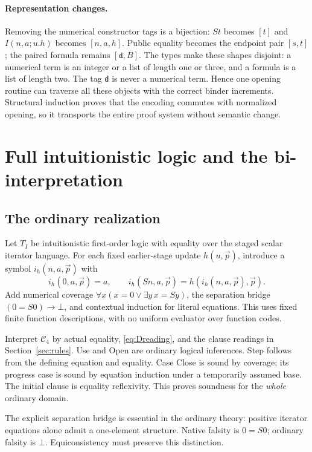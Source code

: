 \documentclass[11pt]{article}
\theoremstyle{definition}
\newcommand{\RC}{\mathcal C_4}
\begin{document}
\paragraph{Representation changes.}
Removing the numerical constructor tags is a bijection: $St$ becomes
$[t]$ and $I(n,a;u.h)$ becomes $[n,a,h]$. Public equality becomes the
endpoint pair $[s,t]$; the paired formula remains $[\texttt{d},B]$.
The types make these shapes disjoint: a numerical term is an integer or
a list of length one or three, and a formula is a list of length two.
The tag \texttt{d} is never a numerical term. Hence one opening routine
can traverse all these objects with the correct binder increments.
Structural induction proves that the encoding commutes with normalized
opening, so it transports the entire proof system without semantic change.

\section{Full intuitionistic logic and the bi-interpretation}
\label{sec:bridge}

\subsection{The ordinary realization}

Let $T_I$ be intuitionistic first-order logic with equality over the staged
scalar iterator language. For each fixed earlier-stage update $h(u,\vec p)$,
introduce a symbol $i_h(n,a,\vec p)$ with
\[
 i_h(0,a,\vec p)=a,\qquad
 i_h(Sn,a,\vec p)=h(i_h(n,a,\vec p),\vec p).
\]
Add numerical coverage $\forall x(x=0\vee\exists y\,x=Sy)$, the separation
bridge $(0=S0)\to\bot$, and contextual induction for literal equations.
This uses fixed finite function descriptions, with no uniform evaluator
over function codes.

Interpret $\RC$ by actual equality, \eqref{eq:Dreading}, and the clause
readings in Section~\ref{sec:rules}. Use and Open are ordinary logical
inferences. Step follows from the defining equation and equality. Case
Close is sound by coverage; its progress case is sound by equation
induction under a temporarily assumed base. The initial clause is equality
reflexivity. This proves soundness for the \emph{whole} ordinary domain.

The explicit separation bridge is essential in the ordinary theory:
positive iterator equations alone admit a one-element structure. Native
falsity is $0=S0$; ordinary falsity is $\bot$. Equiconsistency must preserve
this distinction.
\end{document}

